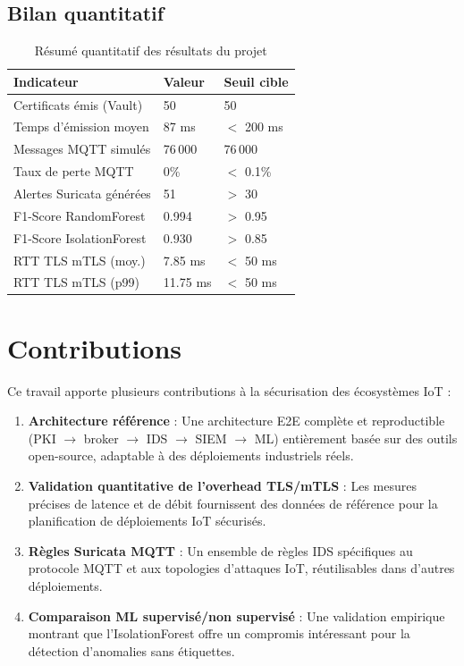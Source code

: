 \subsection{Bilan quantitatif}

\begin{table}[H]
\centering
\caption{Résumé quantitatif des résultats du projet}
\label{tab:bilan_final}
\begin{tabular}{lll}
\toprule
\textbf{Indicateur} & \textbf{Valeur} & \textbf{Seuil cible} \\
\midrule
Certificats émis (Vault) & 50 & 50 \\
Temps d'émission moyen & 87 ms & $<$ 200 ms \\
Messages MQTT simulés & 76\,000 & 76\,000 \\
Taux de perte MQTT & 0\% & $<$ 0.1\% \\
Alertes Suricata générées & 51 & $>$ 30 \\
F1-Score RandomForest & 0.994 & $>$ 0.95 \\
F1-Score IsolationForest & 0.930 & $>$ 0.85 \\
RTT TLS mTLS (moy.) & 7.85 ms & $<$ 50 ms \\
RTT TLS mTLS (p99) & 11.75 ms & $<$ 50 ms \\
\bottomrule
\end{tabular}
\end{table}

\section{Contributions}

Ce travail apporte plusieurs contributions à la sécurisation des écosystèmes IoT :

\begin{enumerate}
  \item \textbf{Architecture référence} : Une architecture E2E complète et reproductible (PKI $\to$ broker $\to$ IDS $\to$ SIEM $\to$ ML) entièrement basée sur des outils open-source, adaptable à des déploiements industriels réels.

  \item \textbf{Validation quantitative de l'overhead TLS/mTLS} : Les mesures précises de latence et de débit fournissent des données de référence pour la planification de déploiements IoT sécurisés.

  \item \textbf{Règles Suricata MQTT} : Un ensemble de règles IDS spécifiques au protocole MQTT et aux topologies d'attaques IoT, réutilisables dans d'autres déploiements.

  \item \textbf{Comparaison ML supervisé/non supervisé} : Une validation empirique montrant que l'IsolationForest offre un compromis intéressant pour la détection d'anomalies sans étiquettes.
\end{enumerate}


